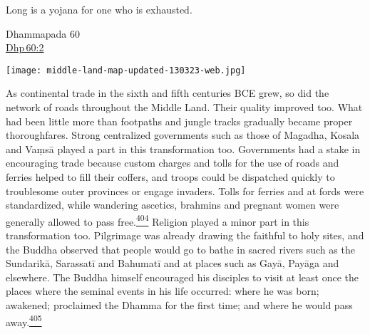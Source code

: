 Long is a yojana for one who is exhausted.

Dhammapada 60\\
\href{https://suttacentral.net/dhp60/en/sujato\#2}{Dhp\,60:2}

\texttt{[image: middle-land-map-updated-130323-web.jpg]}

As continental trade in the sixth and fifth centuries BCE grew, so did
the network of roads throughout the Middle Land. Their quality improved
too. What had been little more than footpaths and jungle tracks
gradually became proper thoroughfares. Strong centralized governments
such as those of Magadha, Kosala and Vaṃsā played a part in this
transformation too. Governments had a stake in encouraging trade because
custom charges and tolls for the use of roads and ferries helped to fill
their coffers, and troops could be dispatched quickly to troublesome
outer provinces or engage invaders. Tolls for ferries and at fords were
standardized, while wandering ascetics, brahmins and pregnant women were
generally allowed to pass
free.\label{footprints_split_012.html_fnref404}\hyperref[footprints_split_024.htmlux5cux23fn404]{\textsuperscript{404}}
Religion played a minor part in this transformation too. Pilgrimage was
already drawing the faithful to holy sites, and the Buddha observed that
people would go to bathe in sacred rivers such as the Sundarikā,
Sarassatī and Bahumatī and at places such as Gayā, Payāga and elsewhere.
The Buddha himself encouraged his disciples to visit at least once the
places where the seminal events in his life occurred: where he was born;
awakened; proclaimed the Dhamma for the first time; and where he would
pass
away.\label{footprints_split_012.html_fnref405}\hyperref[footprints_split_024.htmlux5cux23fn405]{\textsuperscript{405}}

